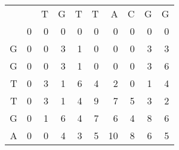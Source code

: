 \begin{enumerate}
	\begin{table}[H]
		\centering
		\begin{tabular}{rrrrrrrrrr}
			&                        & T                      & G                      & T                      & T                      & A                       & C                       & G                       & G                      \\ \cline{2-10} 
			\multicolumn{1}{r|}{}  & \multicolumn{1}{r|}{0} & \multicolumn{1}{r|}{0} & \multicolumn{1}{r|}{0} & \multicolumn{1}{r|}{0} & \multicolumn{1}{r|}{0} & \multicolumn{1}{r|}{0}  & \multicolumn{1}{r|}{0}  & \multicolumn{1}{r|}{0}  & \multicolumn{1}{r|}{0} \\ \cline{2-10} 
			\multicolumn{1}{r|}{G} & \multicolumn{1}{r|}{0} & \multicolumn{1}{r|}{0} & \multicolumn{1}{r|}{3} & \multicolumn{1}{r|}{1} & \multicolumn{1}{r|}{0} & \multicolumn{1}{r|}{0}  & \multicolumn{1}{r|}{0}  & \multicolumn{1}{r|}{3}  & \multicolumn{1}{r|}{3} \\ \cline{2-10} 
			\multicolumn{1}{r|}{G} & \multicolumn{1}{r|}{0} & \multicolumn{1}{r|}{0} & \multicolumn{1}{r|}{3} & \multicolumn{1}{r|}{1} & \multicolumn{1}{r|}{0} & \multicolumn{1}{r|}{0}  & \multicolumn{1}{r|}{0}  & \multicolumn{1}{r|}{3}  & \multicolumn{1}{r|}{6} \\ \cline{2-10} 
			\multicolumn{1}{r|}{T} & \multicolumn{1}{r|}{0} & \multicolumn{1}{r|}{3} & \multicolumn{1}{r|}{1} & \multicolumn{1}{r|}{6} & \multicolumn{1}{r|}{4} & \multicolumn{1}{r|}{2}  & \multicolumn{1}{r|}{0}  & \multicolumn{1}{r|}{1}  & \multicolumn{1}{r|}{4} \\ \cline{2-10} 
			\multicolumn{1}{r|}{T} & \multicolumn{1}{r|}{0} & \multicolumn{1}{r|}{3} & \multicolumn{1}{r|}{1} & \multicolumn{1}{r|}{4} & \multicolumn{1}{r|}{9} & \multicolumn{1}{r|}{7}  & \multicolumn{1}{r|}{5}  & \multicolumn{1}{r|}{3}  & \multicolumn{1}{r|}{2} \\ \cline{2-10} 
			\multicolumn{1}{r|}{G} & \multicolumn{1}{r|}{0} & \multicolumn{1}{r|}{1} & \multicolumn{1}{r|}{6} & \multicolumn{1}{r|}{4} & \multicolumn{1}{r|}{7} & \multicolumn{1}{r|}{6}  & \multicolumn{1}{r|}{4}  & \multicolumn{1}{r|}{8}  & \multicolumn{1}{r|}{6} \\ \cline{2-10} 
			\multicolumn{1}{r|}{A} & \multicolumn{1}{r|}{0} & \multicolumn{1}{r|}{0} & \multicolumn{1}{r|}{4} & \multicolumn{1}{r|}{3} & \multicolumn{1}{r|}{5} & \multicolumn{1}{r|}{10} & \multicolumn{1}{r|}{8}  & \multicolumn{1}{r|}{6}  & \multicolumn{1}{r|}{5} \\ \cline{2-10} 

\end{tabular}
\end{table}
\end{enumerate}
